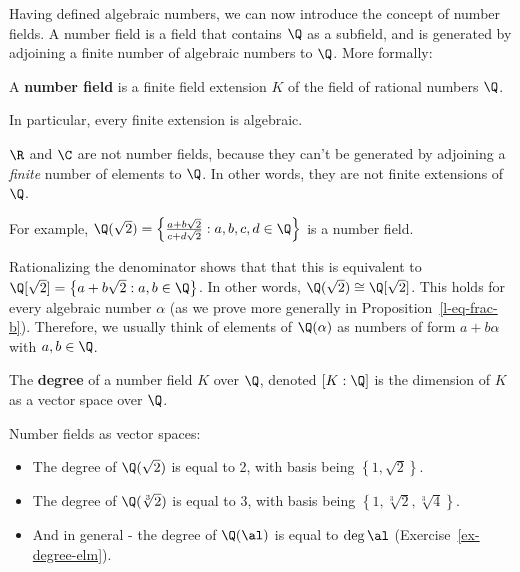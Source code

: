 Having defined algebraic numbers, we can now introduce the concept of number fields.
A number field is a field that contains $\Q$ as a subfield, and is generated by adjoining a finite number of algebraic numbers to $\Q$. More formally:

\begin{df}
    A \textbf{number field} is a finite field extension $K$ of the field of rational numbers $\Q$.
\end{df}

In particular, every finite extension is algebraic.

\begin{rem}
    $\R$ and $\C$ are not number fields, because they can't be generated by adjoining a \textit{finite} number of elements to $\Q$. In other words, they are not finite extensions of $\Q$.
\end{rem}

\begin{ex}
    For example, $\Q(\sqrt{2}) = \left\{\frac{a + b \sqrt{2}}{c + d \sqrt{2}} : a,b,c,d \in \Q\right\}$ is a number field.
\end{ex}

\noindent Rationalizing the denominator shows that that this is equivalent to $\Q[\sqrt{2}] = \left\{a + b \sqrt{2} : a,b \in \Q\right\}$. In other words, $\Q(\sqrt{2}) \cong \Q[\sqrt{2}]$. This holds for every algebraic number $\alpha$ (as we prove more generally in Proposition~\ref{l-eq-frac-b}).
Therefore, we usually think of elements of $\Q(\alpha)$ as numbers of form $a + b\alpha$ with $a, b \in \Q$.

\begin{df}
    The \textbf{degree} of a number field $K$ over $\Q$, denoted $[K:\Q]$ is the dimension of $K$ as a vector space over $\Q$.
\end{df}

\begin{ex} Number fields as vector spaces:
    \begin{itemize}
        \item The degree of $\Q(\sqrt{2})$ is equal to 2, with basis being $\left\{1, \sqrt{2}\right\}$.
        \item The degree of $\Q(\sqrt[3]{2})$ is equal to 3, with basis being $\left\{1, \sqrt[3]{2}, \sqrt[3]{4}\right\}$.
        \item And in general - the degree of $\Q(\al)$ is equal to $\deg \al$ (Exercise~\ref{ex-degree-elm}).
    \end{itemize}
\end{ex}

